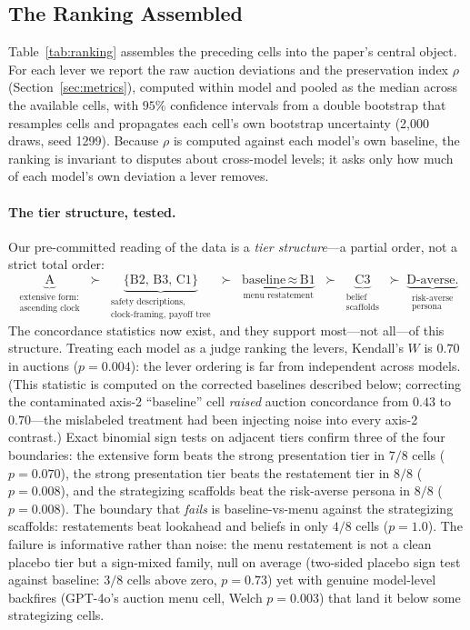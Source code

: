 \subsection{The Ranking Assembled}\label{sec:ranking-synthesis}

Table~\ref{tab:ranking} assembles the preceding cells into the paper's
central object. For each lever we report the raw auction deviations and
the preservation index $\rho$ (Section~\ref{sec:metrics}), computed within
model and pooled as the median across the available cells,
with $95\%$ confidence intervals from a double bootstrap that resamples cells
and propagates each cell's own bootstrap uncertainty (2{,}000 draws, seed
1299). Because $\rho$ is computed against each model's own baseline, the
ranking is invariant to disputes about cross-model levels; it asks only how
much of each model's own deviation a lever removes.

\paragraph{The tier structure, tested.}
Our pre-committed reading of the data is a \emph{tier structure}---a partial
order, not a strict total order:
\begin{equation*}
\underbrace{\text{A}}_{\substack{\text{extensive form:}\\ \text{ascending clock}}}
\;\succ\;
\underbrace{\{\text{B2},\,\text{B3},\,\text{C1}\}}_{\substack{\text{safety descriptions,}\\ \text{clock-framing, payoff tree}}}
\;\succ\;
\underbrace{\text{baseline} \,\approx\, \text{B1}}_{\text{menu restatement}}
\;\succ\;
\underbrace{\text{C3}}_{\substack{\text{belief}\\ \text{scaffolds}}}
\;\succ\;
\underbrace{\text{D-averse.}}_{\substack{\text{risk-averse}\\ \text{persona}}}
\end{equation*}
The concordance statistics now exist, and they support most---not all---of
this structure. Treating each model as a judge ranking the levers, Kendall's
$W$ is $0.70$ in auctions ($p = 0.004$): the lever ordering is far from
independent across models. (This statistic is computed on the corrected
baselines described below; correcting the contaminated axis-2 ``baseline''
cell \emph{raised} auction concordance from $0.43$ to $0.70$---the mislabeled
treatment had been injecting noise into every axis-2 contrast.) Exact
binomial sign tests on adjacent tiers confirm three of the four boundaries:
the extensive form beats the strong presentation tier in $7/8$ cells
($p = 0.070$), the strong presentation tier beats the restatement tier in
$8/8$ ($p = 0.008$), and the strategizing scaffolds beat the risk-averse
persona in $8/8$ ($p = 0.008$).
The boundary that \emph{fails} is baseline-vs-menu against the strategizing
scaffolds: restatements beat lookahead and beliefs in only $4/8$ cells
($p = 1.0$). The failure is informative rather than noise: the menu
restatement is not a clean placebo tier but a sign-mixed family, null on
average (two-sided placebo sign test against baseline: $3/8$ cells above
zero, $p = 0.73$) yet with genuine model-level backfires (GPT-4o's auction
menu cell, Welch $p = 0.003$) that land it below some strategizing cells.

